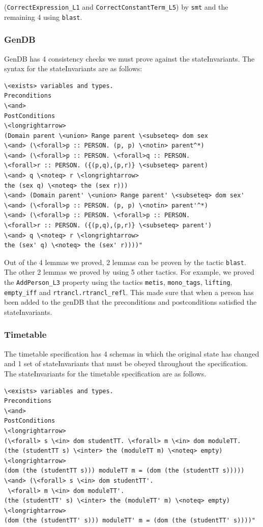 (\verb|CorrectExpression_L1| and \verb|CorrectConstantTerm_L5|) by \verb|smt|
and the remaining 4 using \verb|blast|.

\subsubsection{GenDB}

GenDB \cite{mathlangexamples} has 4 consistency checks we must prove against the stateInvariants. The
syntax for the stateInvariants are as follows:

\begin{verbatim}
\<exists> variables and types.
Preconditions
\<and>
PostConditions
\<longrightarrow>
(Domain parent \<union> Range parent \<subseteq> dom sex
\<and> (\<forall>p :: PERSON. (p, p) \<notin> parent^*)
\<and> (\<forall>p :: PERSON. \<forall>q :: PERSON.
\<forall>r :: PERSON. ({(p,q),(p,r)} \<subseteq> parent)
\<and> q \<noteq> r \<longrightarrow>
the (sex q) \<noteq> the (sex r)))
\<and> (Domain parent' \<union> Range parent' \<subseteq> dom sex'
\<and> (\<forall>p :: PERSON. (p, p) \<notin> parent'^*)
\<and> (\<forall>p :: PERSON. \<forall>p :: PERSON.
\<forall>r :: PERSON. ({(p,q),(p,r)} \<subseteq> parent')
\<and> q \<noteq> r \<longrightarrow>
the (sex' q) \<noteq> the (sex' r))))"
\end{verbatim}

Out of the 4 lemmas we proved, 2 lemmas can be proven by the tactic \verb|blast|.
The other 2 lemmas we proved by using 5 other tactics. For example, we proved the
\verb|AddPerson_L3| property using the tactics \verb|metis|, \verb|mono_tags|,
\verb|lifting|, \verb|empty_iff| and \verb|rtrancl.rtrancl_refl|. This made sure
that when a person has been added to the genDB that the preconditions and
postconditions satisfied the stateInvariants.

\subsubsection{Timetable}

The timetable specification \cite{mathlangexamples} has 4 schemas in which the original state has
changed and 1 set of stateInvariants that must be obeyed throughout the
specification. The stateInvariants for the timetable specification are as
follows.

\begin{verbatim}
\<exists> variables and types.
Preconditions
\<and>
PostConditions
\<longrightarrow>
(\<forall> s \<in> dom studentTT. \<forall> m \<in> dom moduleTT.
(the (studentTT s) \<inter> the (moduleTT m) \<noteq> empty)
\<longrightarrow>
(dom (the (studentTT s))) moduleTT m = (dom (the (studentTT s)))))
\<and> (\<forall> s \<in> dom studentTT'.
 \<forall> m \<in> dom moduleTT'.
(the (studentTT' s) \<inter> the (moduleTT' m) \<noteq> empty)
\<longrightarrow>
(dom (the (studentTT' s))) moduleTT' m = (dom (the (studentTT' s))))"
\end{verbatim}

